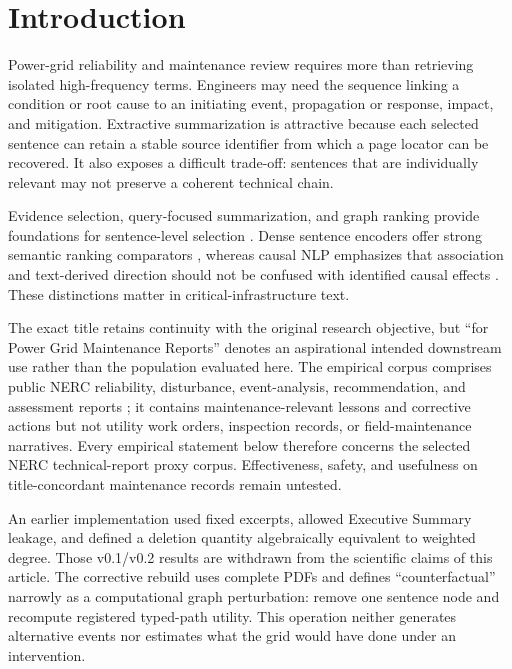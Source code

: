 \documentclass[applsci,article,submit,moreauthors]{Definitions/mdpi}
\begin{document}
\section{Introduction}

Power-grid reliability and maintenance review requires more than retrieving isolated high-frequency terms. Engineers may need the sequence linking a condition or root cause to an initiating event, propagation or response, impact, and mitigation. Extractive summarization is attractive because each selected sentence can retain a stable source identifier from which a page locator can be recovered. It also exposes a difficult trade-off: sentences that are individually relevant may not preserve a coherent technical chain.

Evidence selection, query-focused summarization, and graph ranking provide foundations for sentence-level selection \cite{thorne2018fever,zhong2021qmsum,vig2022exploring,wang2020heterogeneous}. Dense sentence encoders offer strong semantic ranking comparators \cite{reimers2019sentencebert}, whereas causal NLP emphasizes that association and text-derived direction should not be confused with identified causal effects \cite{feder2022causal,du2022ecare}. These distinctions matter in critical-infrastructure text.

The exact title retains continuity with the original research objective, but ``for Power Grid Maintenance Reports'' denotes an aspirational intended downstream use rather than the population evaluated here. The empirical corpus comprises public NERC reliability, disturbance, event-analysis, recommendation, and assessment reports \cite{nercEventAnalysis,nerc2015qualityreport}; it contains maintenance-relevant lessons and corrective actions but not utility work orders, inspection records, or field-maintenance narratives. Every empirical statement below therefore concerns the selected NERC technical-report proxy corpus. Effectiveness, safety, and usefulness on title-concordant maintenance records remain untested.

An earlier implementation used fixed excerpts, allowed Executive Summary leakage, and defined a deletion quantity algebraically equivalent to weighted degree. Those v0.1/v0.2 results are withdrawn from the scientific claims of this article. The corrective rebuild uses complete PDFs and defines ``counterfactual'' narrowly as a computational graph perturbation: remove one sentence node and recompute registered typed-path utility. This operation neither generates alternative events nor estimates what the grid would have done under an intervention.
\end{document}
